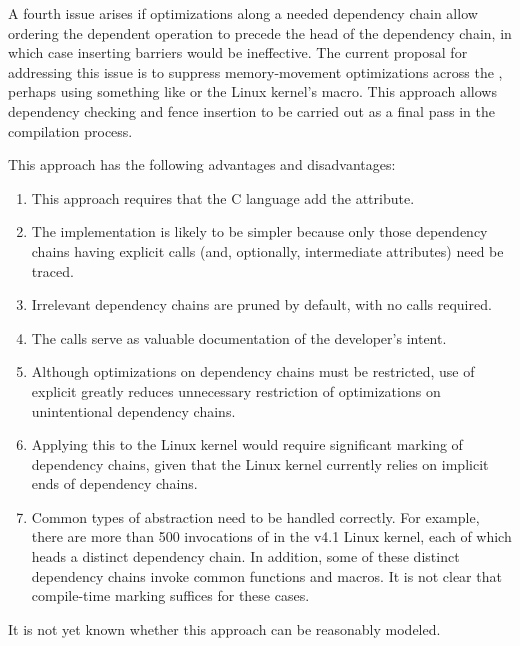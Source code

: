 \documentclass[letterpaper,twocolumn,10pt]{article}
\begin{document}
A fourth issue arises if optimizations along a needed dependency chain
allow ordering the dependent operation to precede the head of the
dependency chain, in which case inserting barriers would be ineffective.
The current proposal for addressing this issue is to suppress memory-movement
optimizations across the , perhaps using something
like  or the Linux kernel's 
macro.
This approach allows dependency checking and fence insertion to be carried
out as a final pass in the compilation process.

This approach has the following advantages and disadvantages:

\begin{enumerate}
\item	This approach requires that the C language add the
	 attribute.
\item	The implementation is likely to be simpler because only those
	dependency chains having explicit 
	calls (and, optionally, intermediate 
	attributes) need be traced.
\item	Irrelevant dependency chains are pruned by default, with no
	 calls required.
\item	The  calls serve as valuable documentation
	of the developer's intent.
\item	Although optimizations on dependency chains must be restricted,
	use of explicit  greatly reduces
	unnecessary restriction of optimizations on unintentional
	dependency chains.
\item	Applying this to the Linux kernel would require significant
	marking of dependency chains, given that the Linux kernel currently
	relies on implicit ends of dependency chains.
\item	Common types of abstraction need to be handled correctly.
	For example, there are more than 500 invocations of
	 in the v4.1 Linux kernel,
	each of which heads a distinct dependency chain.
	In addition, some of these distinct dependency chains invoke
	common functions and macros.
	It is not clear that compile-time marking suffices for these
	cases.
\end{enumerate}

It is not yet known whether this approach can be reasonably modeled.
\end{document}
